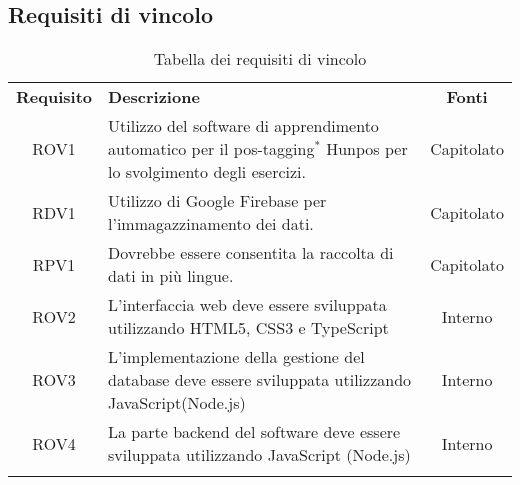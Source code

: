 \subsection{Requisiti di vincolo}
\begin{longtable}{| c | p{10cm} | c |}
		\rowcolor{LightBlue}
		\color{white}\bfseries Requisito & \color{white}\bfseries Descrizione & \color{white}\bfseries Fonti\\[0.25cm]
		ROV1 & Utilizzo del software di apprendimento automatico per il pos-tagging$^*$ Hunpos per lo svolgimento degli esercizi. & Capitolato \\
		RDV1 & Utilizzo di Google Firebase per l'immagazzinamento dei dati. & Capitolato \\
		RPV1 & Dovrebbe essere consentita la raccolta di dati in più lingue. & Capitolato \\
		ROV2 & L’interfaccia web deve essere sviluppata utilizzando HTML5, CSS3 e TypeScript & Interno\\
		ROV3 & L'implementazione della gestione del database deve essere sviluppata utilizzando JavaScript(Node.js) & Interno\\
		ROV4 & La parte backend del software deve essere sviluppata utilizzando JavaScript (Node.js) & Interno\\
		\hline
		\caption{Tabella dei requisiti di vincolo}
\end{longtable}

